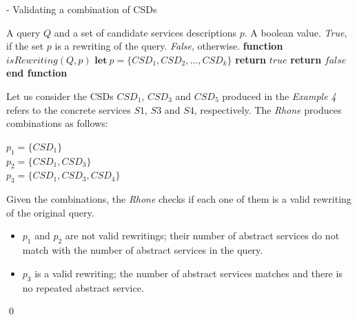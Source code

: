 \begin{algorithm}[h!]
\caption{ - Validating a combination of CSDs}
\label{isrewriting}
\begin{algorithmic}[1]
\REQUIRE A query $Q$ and a set of candidate services descriptions $p$.
\ENSURE A boolean value. \textit{True}, if the set $p$ is a rewriting of the query. \textit{False}, otherwise.
\STATE \textbf{function} $\mathit{isRewriting} (Q, p)$
\STATE  $\mathbf{let} \ p = \lbrace CSD_{1}, CSD_{2}, ..., CSD_{k} \rbrace$
	\STATE \textbf{return} $true$		
\ENDIF
\STATE \textbf{return} $false$
\STATE \textbf{end function}
\end{algorithmic}
\end{algorithm}

\begin{example}%
Let us consider the CSDs $CSD_{1}$, $CSD_{3}$ and $CSD_{5}$ produced in the \textit{Example 4} refers to the concrete services $S1$, $S3$ and $S4$, respectively. The \textit{Rhone} produces combinations as follows:
\begin{flushleft}
$p_{1} = \lbrace CSD_{1} \rbrace$ \\
$p_{2} = \lbrace CSD_{1}, CSD_{3} \rbrace$ \\
$p_{3} = \lbrace CSD_{1}, CSD_{3}, CSD_{4} \rbrace$
\end{flushleft}
Given the combinations, the \textit{Rhone} checks if each one of them is a valid
rewriting of the original query.
\begin{itemize}
\item $p_{1}$ and $p_{2}$ are not valid rewritings; their number of abstract services do not match with the number of abstract services in the query.
\item $p_{3}$ is a valid rewriting; the number of abstract services matches and there is no repeated abstract service. 
\end{itemize}
\qed
\end{example}
	
